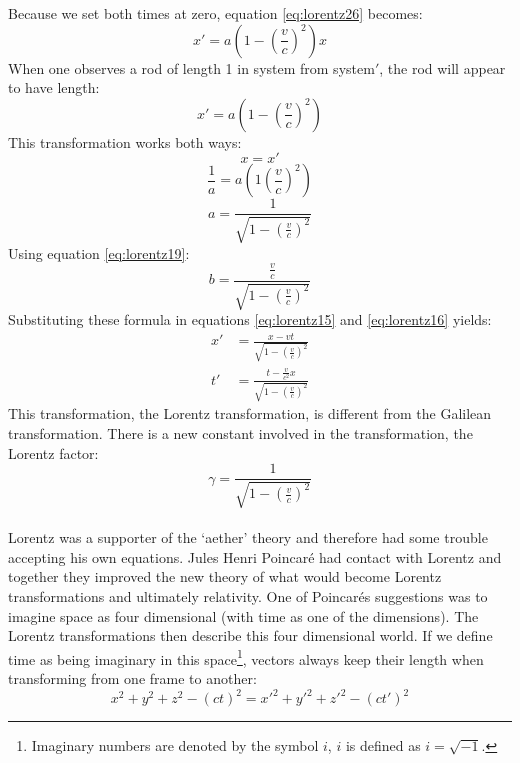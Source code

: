 Because we set both times at zero, equation \ref{eq:lorentz26} becomes:
\begin{equation}\label{eq:lorentz29}
x' = a\left( 1-\left( \frac{v}{c}\right) ^2\right) x
\end{equation}
When one observes a rod of length 1 in system from system$'$, the rod will appear to have length:
\begin{equation}\label{eq:lorentz30}
x' = a\left( 1-\left( \frac{v}{c}\right) ^2\right)
\end{equation}
This transformation works both ways:
\begin{equation}\label{eq:lorentz31}
x=x'
\end{equation}
\begin{equation}\label{eq:lorentz32}
\frac{1}{a} = a\left( 1 \left( \frac{v}{c} \right)^2 \right) 
\end{equation}
\begin{equation}\label{eq:lorentz33}
a= \frac{1}{\sqrt{1-\left( \frac{v}{c} \right)^2}}
\end{equation}
Using equation \ref{eq:lorentz19}:
\begin{equation}\label{eq:lorentz34}
b= \frac{\frac{v}{c}}{\sqrt{1-\left( \frac{v}{c} \right)^2}}
\end{equation}
Substituting these formula in equations \ref{eq:lorentz15} and \ref{eq:lorentz16} yields:
\begin{align}\label{eq:lorentz3536}
x' &= \frac{x - vt}{\sqrt{1-\left( \frac{v}{c} \right)^2}} \\
t' &= \frac{t - \frac{v}{c^2}x}{\sqrt{1-\left( \frac{v}{c} \right)^2}}
\end{align}
This transformation, the Lorentz transformation, is different from the Galilean transformation. There is a new constant involved in the transformation, the Lorentz factor:
\begin{equation}\label{eq:lorentz37}
\gamma = \frac{1}{\sqrt{1-\left( \frac{v}{c} \right)^2}}
\end{equation}
\\ \indent Lorentz was a supporter of the `aether' theory and therefore had some trouble accepting his own equations. Jules Henri Poincar\'e had contact with Lorentz and together they improved the new theory of what would become Lorentz transformations and ultimately relativity. One of Poincar\'es suggestions was to imagine space as four dimensional (with time as one of the dimensions). The Lorentz transformations then describe this four dimensional world. If we define time as being imaginary in this space\footnote{Imaginary numbers are denoted by the symbol $i$, $i$ is defined as $i=\sqrt{-1}$.}, vectors always keep their length when transforming from one frame to another:
\begin{equation}\label{eq:lorentz38}
x^2+y^2+z^2-(ct)^2=x'^2+y'^2+z'^2-(ct')^2
\end{equation}

